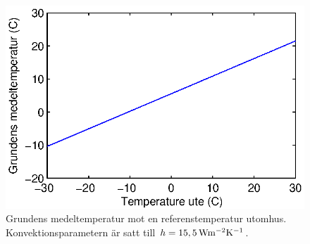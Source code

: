 \begin{figure}
\centering
\includegraphics{images/groundtemperature.eps}
\caption{Grundens medeltemperatur mot en referenstemperatur utomhus. Konvektionsparametern är satt till $h = \unit[15,5]{Wm^{-2}K^{-1}}$.}
\label{fig:groundtemp}
\end{figure}
